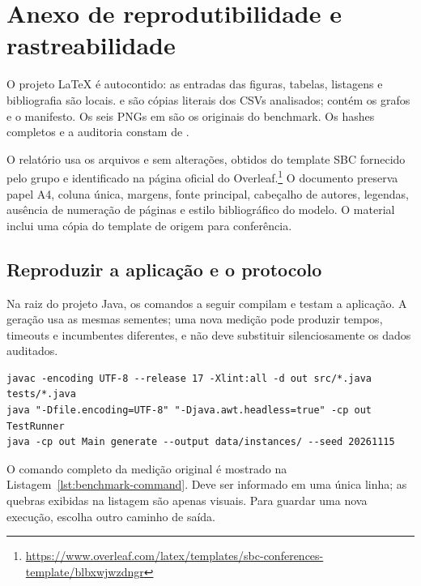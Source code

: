 \clearpage
\section{Anexo de reprodutibilidade e rastreabilidade}
\label{app:reproducibility}

O projeto LaTeX é autocontido: as entradas das figuras, tabelas,
listagens e bibliografia são locais. 
e  são cópias literais dos CSVs
analisados;  contém os grafos e o
manifesto. Os seis PNGs em  são os originais
do benchmark. Os hashes completos e a auditoria constam de
.

O relatório usa os arquivos  e
 sem alterações, obtidos do template SBC
fornecido pelo grupo e identificado na página oficial do
Overleaf.\footnote{\raggedright\url{https://www.overleaf.com/latex/templates/sbc-conferences-template/blbxwjwzdngr}}
O documento preserva papel A4, coluna única, margens,
fonte principal, cabeçalho de autores, legendas,
ausência de numeração de páginas e estilo bibliográfico
do modelo. O material inclui uma cópia do template de
origem para conferência.

\subsection{Reproduzir a aplicação e o protocolo}

Na raiz do projeto Java, os comandos a seguir compilam e
testam a aplicação. A geração usa as mesmas sementes;
uma nova medição pode produzir tempos, timeouts e
incumbentes diferentes, e não deve substituir
silenciosamente os dados auditados.

\begin{lstlisting}[language={},numbers=none,basicstyle=\ttfamily\footnotesize,caption={Compilação e testes usando somente o JDK 17.},label={lst:commands}]
javac -encoding UTF-8 --release 17 -Xlint:all -d out src/*.java tests/*.java
java "-Dfile.encoding=UTF-8" "-Djava.awt.headless=true" -cp out TestRunner
java -cp out Main generate --output data/instances/ --seed 20261115
\end{lstlisting}

O comando completo da medição original é mostrado na
Listagem~\ref{lst:benchmark-command}. Deve ser informado
em uma única linha; as quebras exibidas na listagem são
apenas visuais. Para guardar uma nova execução, escolha
outro caminho de saída.

